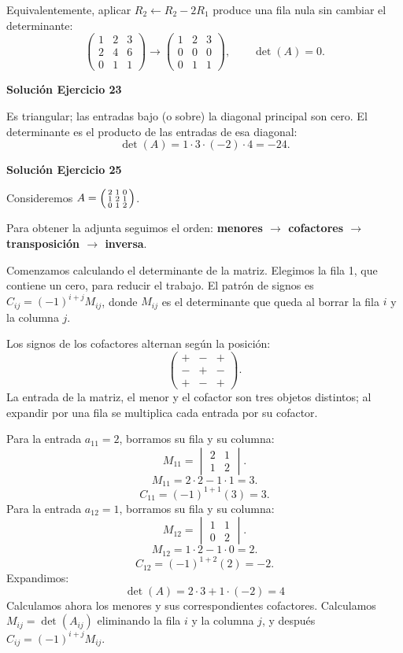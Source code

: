 Equivalentemente, aplicar $R_2\leftarrow R_2-2R_1$ produce una fila nula sin cambiar el determinante:
\[
\begin{pmatrix}1&2&3\\2&4&6\\0&1&1\end{pmatrix}\longrightarrow\begin{pmatrix}1&2&3\\0&0&0\\0&1&1\end{pmatrix},\qquad \boxed{\det(A)=0}.
\]

\par\bigskip\noindent\textbf{Solución Ejercicio 23}\par\nobreak
Es triangular; las entradas bajo (o sobre) la diagonal principal son cero. El determinante es el producto de las entradas de esa diagonal:
\[
\det(A)=1\cdot 3\cdot (-2)\cdot 4=-24.
\]

\par\bigskip\noindent\textbf{Solución Ejercicio 25}\par\nobreak
Consideremos $A=\begin{psmallmatrix}2&1&0\\1&2&1\\0&1&2\end{psmallmatrix}$.

Para obtener la adjunta seguimos el orden: \textbf{menores $\to$ cofactores $\to$ transposición $\to$ inversa}.

Comenzamos calculando el determinante de la matriz.
Elegimos la fila 1, que contiene un cero, para reducir el trabajo. El patrón de signos es $C_{ij}=(-1)^{i+j}M_{ij}$, donde $M_{ij}$ es el determinante que queda al borrar la fila $i$ y la columna $j$.

Los signos de los cofactores alternan según la posición:
\[
\begin{pmatrix}
+&-&+\\
-&+&-\\
+&-&+
\end{pmatrix}.
\]
La entrada de la matriz, el menor y el cofactor son tres objetos distintos; al expandir por una fila se multiplica cada entrada por su cofactor.

Para la entrada $a_{11}=2$, borramos su fila y su columna:
\[
M_{11}=\begin{vmatrix}2&1\\1&2\end{vmatrix}.
\]
\[
M_{11}=2\cdot 2-1\cdot 1=3.
\]
\[
C_{11}=(-1)^{1+1}(3)=3.
\]
Para la entrada $a_{12}=1$, borramos su fila y su columna:
\[
M_{12}=\begin{vmatrix}1&1\\0&2\end{vmatrix}.
\]
\[
M_{12}=1\cdot 2-1\cdot 0=2.
\]
\[
C_{12}=(-1)^{1+2}(2)=-2.
\]
Expandimos: \[
\boxed{\det(A)=2\cdot 3 + 1\cdot (-2)=4}
\]
Calculamos ahora los menores y sus correspondientes cofactores. Calculamos $M_{ij}=\det(A_{ij})$ eliminando la fila $i$ y la columna $j$, y después $C_{ij}=(-1)^{i+j}M_{ij}$.

